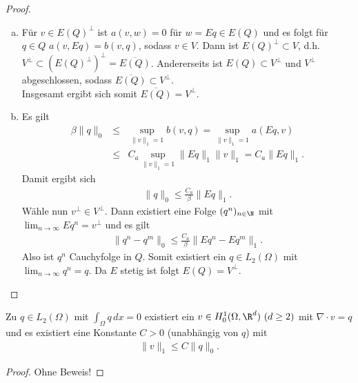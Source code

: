 \begin{proof}
    \begin{enumerate}[a)]
      \item
        Für $v\in E(Q)^\bot$ ist
        $a(v, w) = 0$ für $w = Eq\in E(Q)$
        und es folgt für $q\in Q$
        $a(v, Eq) = b(v, q)$,
        sodass $v\in V$.
        Dann ist $E(Q)^\bot \subset V$, d.h.
        $V^\bot \subset (E(Q)^\bot)^\bot = \overline{E(Q)}$.
        Andererseits ist $E(Q) \subset V^\bot$ und $V^\bot$ abgeschlossen,
        sodass $\overline{E(Q)} \subset V^\bot$. \\
        Insgesamt ergibt sich somit $\overline{E(Q)} = V^\bot$.
      \item
        Es gilt
        \begin{eqnarray*}
                \beta \|q\|_0
            &\le& \sup_{\|v\|_1 = 1} b(v, q)
            = \sup_{\|v\|_1 = 1} a(Eq, v) \\
            &\le& C_a \sup_{\|v\|_1 = 1} \|Eq\|_1 \|v\|_1
            = C_a \|Eq\|_1.
        \end{eqnarray*}
        Damit ergibt sich
        \begin{eqnarray*}
            \|q\|_0 \le \frac{C_a}{\beta} \|Eq\|_1.
        \end{eqnarray*}
        Wähle nun $v^\bot\in V^\bot$.
        Dann existiert eine Folge $(q^n)_{n\in \N}$ mit
        $\lim_{n\to \infty} Eq^n = v^\bot$ und es gilt
        \begin{eqnarray*}
                \|q^n - q^m\|_0
            \le \frac{C_a}{\beta} \|Eq^n - Eq^m\|_1.
        \end{eqnarray*}
        Also ist $q^n$ Cauchyfolge in $Q$.
        Somit existiert ein $q\in L_2(\Omega)$ mit $\lim_{n\to \infty} q^n = q$.
        Da $E$ stetig ist folgt $E(Q) = V^\bot$.
    \end{enumerate}
\end{proof}


\begin{Satz}
    \label{satz:5.11}
    Zu $q\in L_2(\Omega)$ mit $\int_\Omega q \,dx = 0$ existiert ein $v\in H_0^1
    (\Omega, \R^d) \ (d \ge 2)$ mit $\nabla \cdot v = q$ und es existiert eine
    Konstante $C > 0$ (unabhängig von $q$) mit
    \begin{eqnarray*}
        \|v\|_1 \le C \|q\|_0.
    \end{eqnarray*}
\end{Satz}


\begin{proof}
    Ohne Beweis!
\end{proof}



